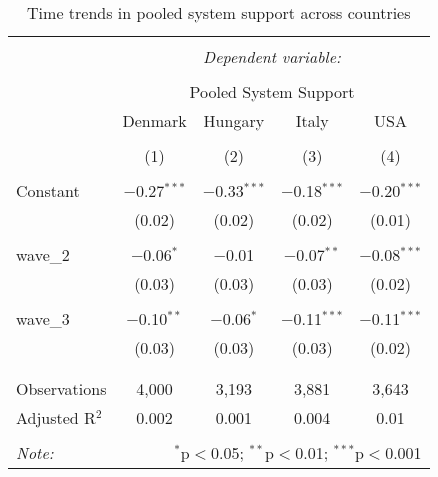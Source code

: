 
\begin{table}[!htbp] \centering 
  \caption{Time trends in pooled system support across countries} 
  \label{tab:reg_sys_2} 
\begin{tabular}{@{\extracolsep{5pt}}lcccc} 
\\[-1.8ex]\hline 
\hline \\[-1.8ex] 
 & \multicolumn{4}{c}{\textit{Dependent variable:}} \\ 
\cline{2-5} 
\\[-1.8ex] & \multicolumn{4}{c}{Pooled System Support} \\ 
 & Denmark & Hungary & Italy & USA \\ 
\\[-1.8ex] & (1) & (2) & (3) & (4)\\ 
\hline \\[-1.8ex] 
 Constant & $-$0.27$^{***}$ & $-$0.33$^{***}$ & $-$0.18$^{***}$ & $-$0.20$^{***}$ \\ 
  & (0.02) & (0.02) & (0.02) & (0.01) \\ 
  & & & & \\ 
 wave\_2 & $-$0.06$^{*}$ & $-$0.01 & $-$0.07$^{**}$ & $-$0.08$^{***}$ \\ 
  & (0.03) & (0.03) & (0.03) & (0.02) \\ 
  & & & & \\ 
 wave\_3 & $-$0.10$^{**}$ & $-$0.06$^{*}$ & $-$0.11$^{***}$ & $-$0.11$^{***}$ \\ 
  & (0.03) & (0.03) & (0.03) & (0.02) \\ 
  & & & & \\ 
\hline \\[-1.8ex] 
Observations & 4,000 & 3,193 & 3,881 & 3,643 \\ 
Adjusted R$^{2}$ & 0.002 & 0.001 & 0.004 & 0.01 \\ 
\hline 
\hline \\[-1.8ex] 
\textit{Note:}  & \multicolumn{4}{r}{$^{*}$p$<$0.05; $^{**}$p$<$0.01; $^{***}$p$<$0.001} \\ 
\end{tabular} 
\end{table} 
